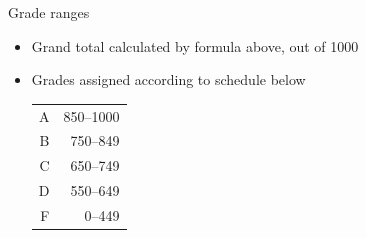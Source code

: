 \documentclass[xcolor=dvipsnames]{beamer}
\theoremstyle{definition}
\begin{document}
\begin{frame}{Grade ranges}
\begin{itemize}
\item Grand total calculated by formula above, out of 1000
\item Grades assigned according to schedule below
\begin{center}\begin{tabular}{rr}
A&850--1000\\
B&750--849\\
C&650--749\\
D&550--649\\
F&0--449
\end{tabular}\end{center}
\end{itemize}
\end{frame}
\end{document}
